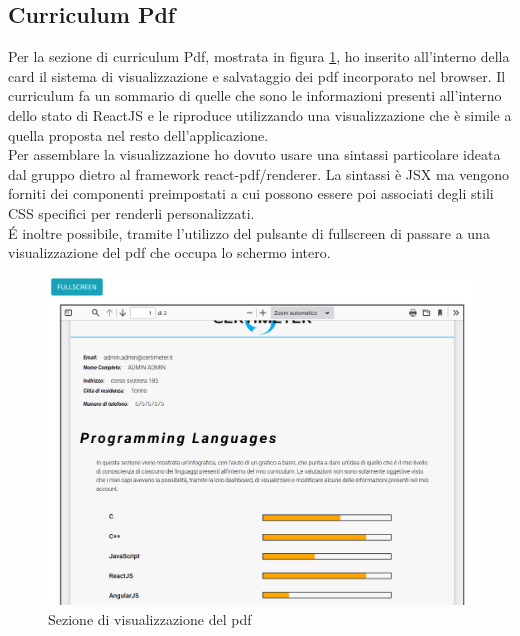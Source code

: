 \subsection{Curriculum Pdf}
Per la sezione di curriculum Pdf, mostrata in figura \ref{fig:curriculum}, ho inserito all'interno della card il sistema di visualizzazione e salvataggio dei pdf incorporato nel browser. Il curriculum fa un sommario di quelle che sono le informazioni presenti all'interno dello stato di ReactJS e le riproduce utilizzando una visualizzazione che è simile a quella proposta nel resto dell'applicazione.
\\
Per assemblare la visualizzazione ho dovuto usare una sintassi particolare ideata dal gruppo dietro al framework react-pdf/renderer. La sintassi è JSX ma vengono forniti dei componenti preimpostati a cui possono essere poi associati degli stili CSS specifici per renderli personalizzati.
\\
\'E inoltre possibile, tramite l'utilizzo del pulsante di fullscreen di passare a una visualizzazione del pdf che occupa lo schermo intero.

\begin{figure}[h]
    \centering
    \includegraphics[width=450px]{./images/pdf.png}
    \caption{Sezione di visualizzazione del pdf}
    \label{fig:curriculum}
\end{figure}

